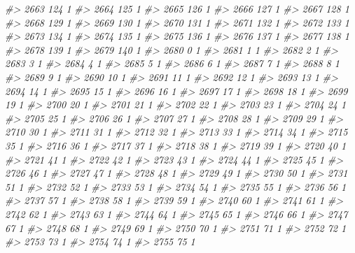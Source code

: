 \documentclass[]{article}
\newenvironment{Shaded}{\begin{snugshade}}{\end{snugshade}}
\newcommand{\CommentTok}[1]{\textcolor[rgb]{0.56,0.35,0.01}{\textit{#1}}}
\begin{document}
\begin{Shaded}
\begin{Highlighting}[]
\CommentTok{#> 2663 124  1}
\CommentTok{#> 2664 125  1}
\CommentTok{#> 2665 126  1}
\CommentTok{#> 2666 127  1}
\CommentTok{#> 2667 128  1}
\CommentTok{#> 2668 129  1}
\CommentTok{#> 2669 130  1}
\CommentTok{#> 2670 131  1}
\CommentTok{#> 2671 132  1}
\CommentTok{#> 2672 133  1}
\CommentTok{#> 2673 134  1}
\CommentTok{#> 2674 135  1}
\CommentTok{#> 2675 136  1}
\CommentTok{#> 2676 137  1}
\CommentTok{#> 2677 138  1}
\CommentTok{#> 2678 139  1}
\CommentTok{#> 2679 140  1}
\CommentTok{#> 2680   0  1}
\CommentTok{#> 2681   1  1}
\CommentTok{#> 2682   2  1}
\CommentTok{#> 2683   3  1}
\CommentTok{#> 2684   4  1}
\CommentTok{#> 2685   5  1}
\CommentTok{#> 2686   6  1}
\CommentTok{#> 2687   7  1}
\CommentTok{#> 2688   8  1}
\CommentTok{#> 2689   9  1}
\CommentTok{#> 2690  10  1}
\CommentTok{#> 2691  11  1}
\CommentTok{#> 2692  12  1}
\CommentTok{#> 2693  13  1}
\CommentTok{#> 2694  14  1}
\CommentTok{#> 2695  15  1}
\CommentTok{#> 2696  16  1}
\CommentTok{#> 2697  17  1}
\CommentTok{#> 2698  18  1}
\CommentTok{#> 2699  19  1}
\CommentTok{#> 2700  20  1}
\CommentTok{#> 2701  21  1}
\CommentTok{#> 2702  22  1}
\CommentTok{#> 2703  23  1}
\CommentTok{#> 2704  24  1}
\CommentTok{#> 2705  25  1}
\CommentTok{#> 2706  26  1}
\CommentTok{#> 2707  27  1}
\CommentTok{#> 2708  28  1}
\CommentTok{#> 2709  29  1}
\CommentTok{#> 2710  30  1}
\CommentTok{#> 2711  31  1}
\CommentTok{#> 2712  32  1}
\CommentTok{#> 2713  33  1}
\CommentTok{#> 2714  34  1}
\CommentTok{#> 2715  35  1}
\CommentTok{#> 2716  36  1}
\CommentTok{#> 2717  37  1}
\CommentTok{#> 2718  38  1}
\CommentTok{#> 2719  39  1}
\CommentTok{#> 2720  40  1}
\CommentTok{#> 2721  41  1}
\CommentTok{#> 2722  42  1}
\CommentTok{#> 2723  43  1}
\CommentTok{#> 2724  44  1}
\CommentTok{#> 2725  45  1}
\CommentTok{#> 2726  46  1}
\CommentTok{#> 2727  47  1}
\CommentTok{#> 2728  48  1}
\CommentTok{#> 2729  49  1}
\CommentTok{#> 2730  50  1}
\CommentTok{#> 2731  51  1}
\CommentTok{#> 2732  52  1}
\CommentTok{#> 2733  53  1}
\CommentTok{#> 2734  54  1}
\CommentTok{#> 2735  55  1}
\CommentTok{#> 2736  56  1}
\CommentTok{#> 2737  57  1}
\CommentTok{#> 2738  58  1}
\CommentTok{#> 2739  59  1}
\CommentTok{#> 2740  60  1}
\CommentTok{#> 2741  61  1}
\CommentTok{#> 2742  62  1}
\CommentTok{#> 2743  63  1}
\CommentTok{#> 2744  64  1}
\CommentTok{#> 2745  65  1}
\CommentTok{#> 2746  66  1}
\CommentTok{#> 2747  67  1}
\CommentTok{#> 2748  68  1}
\CommentTok{#> 2749  69  1}
\CommentTok{#> 2750  70  1}
\CommentTok{#> 2751  71  1}
\CommentTok{#> 2752  72  1}
\CommentTok{#> 2753  73  1}
\CommentTok{#> 2754  74  1}
\CommentTok{#> 2755  75  1}

\end{Highlighting}
\end{Shaded}
\end{document}
